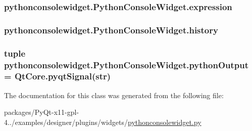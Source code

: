 \subsubsection[{expression}]{\setlength{\rightskip}{0pt plus 5cm}pythonconsolewidget.\+Python\+Console\+Widget.\+expression}\label{classpythonconsolewidget_1_1PythonConsoleWidget_aea7825cc8aeb6678a4a3b778898bd2c8}
\hypertarget{classpythonconsolewidget_1_1PythonConsoleWidget_a7648fd3b2dd0207310acca9ae384148a}{}
\subsubsection[{history}]{\setlength{\rightskip}{0pt plus 5cm}pythonconsolewidget.\+Python\+Console\+Widget.\+history}\label{classpythonconsolewidget_1_1PythonConsoleWidget_a7648fd3b2dd0207310acca9ae384148a}
\hypertarget{classpythonconsolewidget_1_1PythonConsoleWidget_a739af39a444c371e793bc5240ebf4406}{}
\subsubsection[{python\+Output}]{\setlength{\rightskip}{0pt plus 5cm}tuple pythonconsolewidget.\+Python\+Console\+Widget.\+python\+Output = Qt\+Core.\+pyqt\+Signal(str)\hspace{0.3cm}{\ttfamily [static]}}\label{classpythonconsolewidget_1_1PythonConsoleWidget_a739af39a444c371e793bc5240ebf4406}


The documentation for this class was generated from the following file\+:\begin{DoxyCompactItemize}
\item 
packages/\+Py\+Qt-\/x11-\/gpl-\/4../examples/designer/plugins/widgets/\hyperlink{pythonconsolewidget_8py}{pythonconsolewidget.\+py}\end{DoxyCompactItemize}
